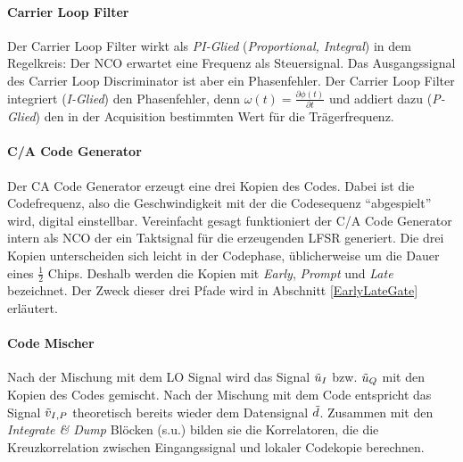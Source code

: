 \paragraph{Carrier Loop Filter} Der Carrier Loop Filter wirkt als \emph{PI-Glied} (\emph{Proportional, Integral}) in dem Regelkreis: Der NCO erwartet eine Frequenz als Steuersignal. Das Ausgangssignal des Carrier Loop Discriminator ist aber ein Phasenfehler. Der Carrier Loop Filter integriert (\emph{I-Glied}) den Phasenfehler, denn $\omega(t)=\frac{\partial \phi(t)}{\partial t}$ und addiert dazu (\emph{P-Glied}) den in der Acquisition bestimmten Wert für die Trägerfrequenz.

\paragraph{C/A Code Generator} Der \gls{CA} Code Generator erzeugt eine drei Kopien des Codes. Dabei ist die Codefrequenz, also die Geschwindigkeit mit der die Codesequenz \enquote{abgespielt} wird, digital einstellbar. Vereinfacht gesagt  funktioniert der C/A Code Generator intern als \gls{NCO} der ein Taktsignal für die erzeugenden \gls{LFSR} generiert. Die drei Kopien unterscheiden sich leicht in der Codephase, üblicherweise um die Dauer eines $\frac{1}{2}$ Chips. Deshalb werden die Kopien mit \emph{Early}, \emph{Prompt} und \emph{Late} bezeichnet. Der Zweck dieser drei Pfade wird in Abschnitt \ref{EarlyLateGate} erläutert.

\paragraph{Code Mischer} Nach der Mischung mit dem LO Signal wird das Signal $\tilde{u}_I$ bzw. $\tilde{u}_Q$ mit den Kopien des Codes gemischt. Nach der Mischung mit dem Code entspricht das Signal $\tilde{v}_{I,P}$ theoretisch bereits wieder dem Datensignal $\tilde{d}$. Zusammen mit den \emph{Integrate \& Dump} Blöcken (s.u.) bilden sie die Korrelatoren, die die Kreuzkorrelation zwischen Eingangssignal und lokaler Codekopie berechnen.

